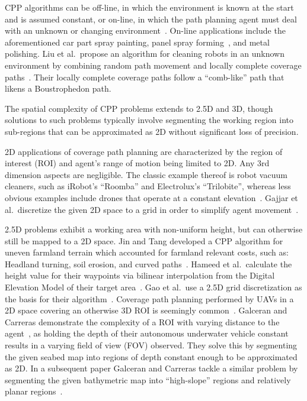 CPP algorithms can be off-line, in which the environment is known at the start and is assumed constant, or on-line, in which the path planning agent must deal with an unknown or changing environment~\cite{CPP_survey_for_robotics}.
On-line applications include the aforementioned car part spray painting, panel spray forming~\cite{Robotic_grc_spraying}, and metal polishing.
Liu et al.\ propose an algorithm for cleaning robots in an unknown environment by combining random path movement and locally complete coverage paths~\cite{CCPP_cleaning_robots}.
Their locally complete coverage paths follow a ``comb-like'' path that likens a Boustrophedon path.

The spatial complexity of CPP problems extends to 2.5D and 3D, though solutions to such problems typically involve segmenting the working region into sub-regions that can be approximated as 2D without significant loss of precision.

2D applications of coverage path planning are characterized by the region of interest (ROI) and agent's range of motion being limited to 2D.
Any 3rd dimension aspects are negligible.
The classic example thereof is robot vacuum cleaners, such as iRobot's ``Roomba'' and Electrolux's ``Trilobite''\cite{CCPP_cleaning_robots}, whereas less obvious examples include drones that operate at a constant elevation~\cite{CPP_2D_convex_regions_uav}.
Gajjar et al.\ discretize the given 2D space to a grid in order to simplify agent movement~\cite{CCPP_known_2D_env}.

2.5D problems exhibit a working area with non-uniform height, but can otherwise still be mapped to a 2D space.
Jin and Tang developed a CPP algorithm for uneven farmland terrain which accounted for farmland relevant costs, such as: Headland turning, soil erosion, and curved paths~\cite{CPP_farming_terrain}.
Hameed et al.\ calculate the height value for their waypoints via bilinear interpolation from the Digital Elevation Model of their target area~\cite{CPP_2.5D_agriculture}.
Gao et al.\ use a 2.5D grid discretization as the basis for their algorithm~\cite{CPP_2.5D_grid_map}.
Coverage path planning performed by UAVs in a 2D space covering an otherwise 3D ROI is seemingly common~\cite{CPP_2.5D_SAA_grid_based_UAV_3D_recons, CPP_2.5D_UAV_3D_terrain_recons, CPP_multi_UAV, CPP_2D_convex_regions_uav}.
Galceran and Carreras demonstrate the complexity of a ROI with varying distance to the agent~\cite{CPP_2.5D_seabed_2012}, as holding the depth of their autonomous underwater vehicle constant results in a varying field of view (FOV) observed.
They solve this by segmenting the given seabed map into regions of depth constant enough to be approximated as 2D.
In a subsequent paper Galceran and Carreras tackle a similar problem by segmenting the given bathymetric map into ``high-slope'' regions and relatively planar regions~\cite{CPP_2.5D_seabed_2013}.

